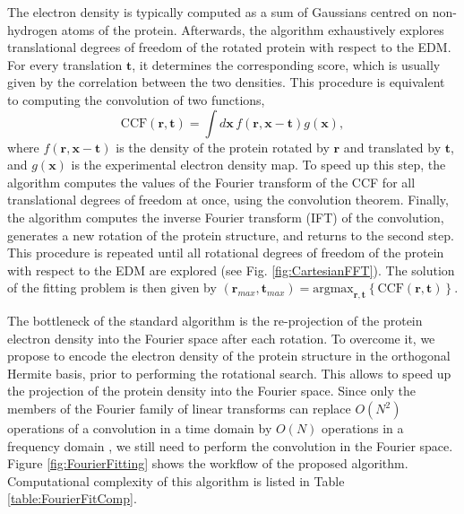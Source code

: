 %
The electron density is typically computed as a sum of Gaussians centred on non-hydrogen atoms of the protein. 
%
Afterwards, the algorithm exhaustively
explores translational degrees of freedom of the rotated protein with
respect to the EDM. For every translation $\mathbf{t}$,
it determines the corresponding score, which is usually given by the
correlation between the two densities. This procedure is equivalent
to computing the convolution of two functions, 
\begin{equation}
\textrm{CCF}(\mathbf{r}, \mathbf{t})=\int d\mathbf{x}\, f(\mathbf{r},\mathbf{x}-\mathbf{t})g(\mathbf{x}),\label{eq:convolution}
\end{equation}
where $f(\mathbf{r},\mathbf{x-t})$ is the density of the protein rotated by $\mathbf{r}$ and translated by $\mathbf{t}$,
and $g(\mathbf{x})$ is the experimental electron density map. 
To speed up this step, the algorithm
computes the values of the Fourier transform of the CCF
for all translational degrees of freedom at once, using the convolution
theorem. Finally, the algorithm computes the inverse Fourier transform
(IFT) of the convolution, generates a new rotation of the protein
structure, and returns to the second step. This procedure is repeated
until all rotational degrees of freedom of the protein with respect
to the EDM are explored (see Fig. \ref{fig:CartesianFFT}). The solution
of the fitting problem is then given by $(\mathbf{r}_{max},\mathbf{t}_{max})=\mbox{argmax}_{\mathbf{r}, \mathbf{t}}\left\{ \textrm{CCF}(\mathbf{r}, \mathbf{t})\right\} $.


The bottleneck of the standard algorithm is 
the re-projection of the protein electron density into the Fourier space after each rotation.
%
To overcome it, we propose to
encode the electron density of the protein structure in the orthogonal
Hermite basis, prior to performing the rotational search. This
allows to speed up the projection of the protein density into the
Fourier space. 
Since only the members of the Fourier family of linear transforms
can replace $O(N^2)$ operations of a convolution in a time domain by $O(N)$ operations in a frequency domain \cite{stone:1998}, we still need to
perform the convolution in the Fourier space.
%
Figure \ref{fig:FourierFitting} shows the workflow of the proposed algorithm.
Computational complexity of this algorithm is listed in Table \ref{table:FourierFitComp}.

